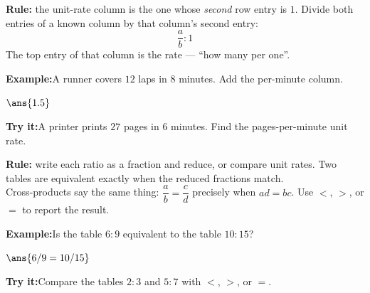 \documentclass[12pt]{article}
\begin{document}
\begin{formulabox}
\textbf{Rule:} the unit-rate column is the one whose \emph{second} row entry
is $1$. Divide both entries of a known column by that column's second entry:
\[ \frac{a}{b} : 1 \]
The top entry of that column is the rate --- ``how many per one''.
\end{formulabox}
\begin{examplebox}
\textbf{Example:}\quad A runner covers $12$ laps in $8$ minutes. Add the
per-minute column.
\par
$\ans{1.5}$
\end{examplebox}
\begin{tryitbox}
\textbf{Try it:}\quad A printer prints $27$ pages in $6$ minutes. Find the
pages-per-minute unit rate.\\[2pt]
\end{tryitbox}

\begin{formulabox}
\textbf{Rule:} write each ratio as a fraction and reduce, or compare unit
rates. Two tables are equivalent exactly when the reduced fractions match.\\[3pt]
Cross-products say the same thing: $\dfrac{a}{b} = \dfrac{c}{d}$ precisely
when $ad = bc$. Use $<$, $>$, or $=$ to report the result.
\end{formulabox}
\begin{examplebox}
\textbf{Example:}\quad Is the table $6 : 9$ equivalent to the table
$10 : 15$?
\par
$\ans{6/9 = 10/15}$
\end{examplebox}
\begin{tryitbox}
\textbf{Try it:}\quad Compare the tables $2 : 3$ and $5 : 7$ with $<$, $>$,
or $=$.\\[2pt]
\end{tryitbox}
\end{document}
